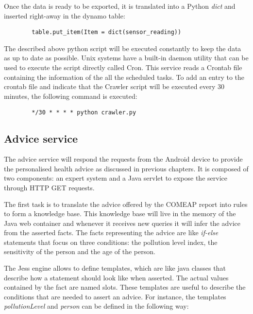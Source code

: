 Once the data is ready to be exported, it is translated into a Python \textit{dict} and inserted right-away in the dynamo table: \bigskip

{\centering
\begin{BVerbatim}
        table.put_item(Item = dict(sensor_reading))
\end{BVerbatim}
\par
}\bigskip


The described above python script will be executed constantly to keep the data as up to date as possible. Unix systems have a built-in daemon utility that can be used to execute the script directly called Cron. This service reads a Crontab file containing the information of the all the scheduled tasks. To add an entry to the crontab file and indicate that the Crawler script will be executed every 30 minutes, the following command is executed: \bigskip

{\centering
\begin{BVerbatim}
        */30 * * * * python crawler.py
\end{BVerbatim}
\par
}

\subsection{Advice service}
The advice service will respond the requests from the Android device to provide the personalised health advice as discussed in previous chapters. It is composed of two components: an expert system and a Java servlet to expose the service through HTTP GET requests. 

The first task is to translate the advice offered by the COMEAP report into rules to form a knowledge base. This knowledge base will live in the memory of the Java web container and whenever it receives new queries it will infer the advice from the asserted facts. The facts representing the advice are like \textit{if-else} statements that focus on three conditions: the pollution level index, the sensitivity of the person and the age of the person. 

The Jess engine allows to define templates, which are like java classes that describe how a statement should look like when asserted. The actual values contained by the fact are named slots. These templates are useful to describe the conditions that are needed to assert an advice. For instance, the templates \textit{pollutionLevel} and \textit{person} can be defined in the following way: 

